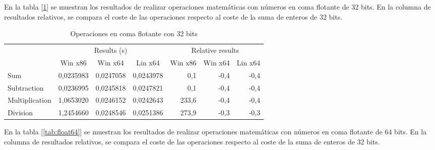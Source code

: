 En la tabla [\ref{tab:float32}] se muestran los resultados de realizar operaciones matemáticas con números en coma flotante de 32 bits. En la columna de resultados relativos, se compara el coste de las operaciones respecto al coste de la suma de enteros de 32 bits.\\

\begin{table}[h]
\centering
\begin{tabular}{@{}l|rrr|rrr|@{}}
\cmidrule(l){2-7}
                                     & \multicolumn{3}{c|}{Results (s)}                                                               & \multicolumn{3}{c|}{Relative results}                                                      \\ \cmidrule(l){2-7} 
                                     & \multicolumn{1}{c|}{Win x86} & \multicolumn{1}{c|}{Win x64} & \multicolumn{1}{c|}{Lin x64} & \multicolumn{1}{c|}{Win x86} & \multicolumn{1}{c|}{Win x64} & \multicolumn{1}{c|}{Lin x64} \\ \midrule
\multicolumn{1}{|l|}{Sum}            & 0,0235983                    & 0,0247058                    & 0,0243978                    & 0,1                          & -0,4                         & -0,4                         \\ \cmidrule(r){1-1}
\multicolumn{1}{|l|}{Subtraction}    & 0,0236995                    & 0,0245818                    & 0,0247821                    & 0,1                          & -0,4                         & -0,4                         \\ \cmidrule(r){1-1}
\multicolumn{1}{|l|}{Multiplication} & 1,0653020                    & 0,0246152                    & 0,0242643                    & 233,6                        & -0,4                         & -0,4                         \\ \cmidrule(r){1-1}
\multicolumn{1}{|l|}{Division}       & 1,2454660                    & 0,0248546                    & 0,0251386                    & 273,9                        & -0,3                         & -0,3                         \\ \bottomrule
\end{tabular}
\caption{Operaciones en coma flotante con 32 bits}
\label{tab:float32}
\end{table}

En la tabla [\ref{tab:float64}] se muestran los resultados de realizar operaciones matemáticas con números en coma flotante de 64 bits. En la columna de resultados relativos, se compara el coste de las operaciones respecto al coste de la suma de enteros de 32 bits.\\

